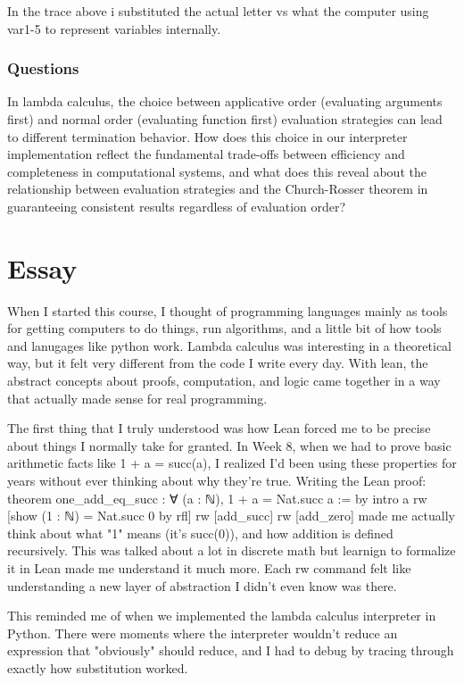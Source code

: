 \documentclass{article}
\theoremstyle{theorem}
\theoremstyle{definition}
\theoremstyle{remark}
\begin{document}
In the trace above i substituted the actual letter vs what the computer using var1-5 to represent variables internally.

\subsubsection{Questions}

In lambda calculus, the choice between applicative order (evaluating arguments first) and normal order (evaluating function first) evaluation strategies can lead to different termination behavior. How does this choice in our interpreter implementation reflect the fundamental trade-offs between efficiency and completeness in computational systems, and what does this reveal about the relationship between evaluation strategies and the Church-Rosser theorem in guaranteeing consistent results regardless of evaluation order?

\section{Essay}

When I started this course, I thought of programming languages mainly as tools for getting computers
to do things, run algorithms, and a little bit of how tools and lanugages like python work. Lambda calculus
was interesting in a theoretical way, but it felt very different from the code I write every day. With lean,
the abstract concepts about proofs, computation, and logic came together in a way that actually made sense for real programming.

The first thing that I truly understood was how Lean forced me to be precise about things I normally take for granted.
In Week 8, when we had to prove basic arithmetic facts like 1 + a = succ(a), I realized I'd been using these
properties for years without ever thinking about why they're true. Writing the Lean proof:
    theorem one_add_eq_succ : ∀ (a : ℕ), 1 + a = Nat.succ a := by
    intro a
    rw [show (1 : ℕ) = Nat.succ 0 by rfl]
    rw [add_succ]
    rw [add_zero]
made me actually think about what "1" means (it's succ(0)), and how addition is defined recursively.
This was talked about a lot in discrete math but learnign to formalize it in Lean made me understand it much more.
Each rw command felt like understanding a new layer of abstraction I didn't even know was there.

This reminded me of when we implemented the lambda calculus interpreter in Python. There were
moments where the interpreter wouldn't reduce an expression that "obviously" should reduce, and
I had to debug by tracing through exactly how substitution worked.
\end{document}
